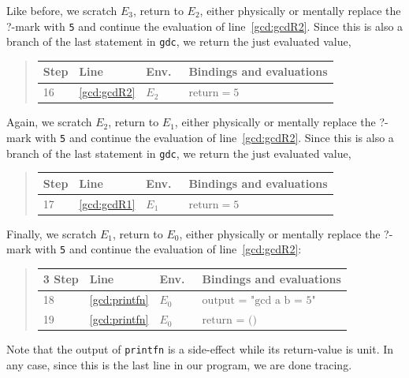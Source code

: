 \documentclass[springer.tex]{subfiles}
\begin{document}
Like before, we scratch $E_3$, return to $E_2$, either physically or mentally replace the ?-mark with \lstinline!5! and continue the evaluation of line~\ref{gcd:gcdR2}. Since this is also a branch of the last statement in \lstinline{gdc}, we return the just evaluated value,
\begin{quote}
  \begin{tabular*}{0.6\linewidth}{l|lll}
    Step & Line & Env.\ & Bindings and evaluations\\
    \hline
    16&\ref{gcd:gcdR2} & $E_2$ & $\text{return} = 5$\\
  \end{tabular*}
\end{quote}
Again, we scratch $E_2$, return to $E_1$, either physically or mentally replace the ?-mark with \lstinline!5! and continue the evaluation of line~\ref{gcd:gcdR2}. Since this is also a branch of the last statement in \lstinline{gdc}, we return the just evaluated value,
\begin{quote}
  \begin{tabular*}{0.6\linewidth}{l|lll}
    Step & Line & Env.\ & Bindings and evaluations\\
    \hline
    17&\ref{gcd:gcdR1} & $E_1$ & $\text{return} = 5$\\
  \end{tabular*}
\end{quote}
Finally, we scratch $E_1$, return to $E_0$, either physically or mentally replace the ?-mark with \lstinline!5! and continue the evaluation of line~\ref{gcd:gcdR2}:
\begin{quote}
  \begin{tabular*}{0.6\linewidth}{l|lll}3
    Step & Line & Env.\ & Bindings and evaluations\\
    \hline
    18 & \ref{gcd:printfn} & $E_0$ & $\text{output = "gcd a b = 5"}$\\
    19 & \ref{gcd:printfn} & $E_0$ & $\text{return = ()}$\\
  \end{tabular*}
\end{quote}
Note that the output of \lstinline{printfn} is a side-effect while its return-value is unit. In any case, since this is the last line in our program, we are done tracing.
\end{document}
